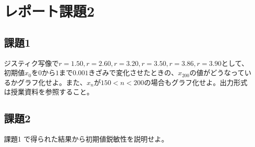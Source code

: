 \section{レポート課題2}
\subsection{課題1}
ジスティク写像で$r = 1.50, r = 2.60, r = 3.20, r = 3.50, r = 3.86, r = 3.90$として、初期値$x_0$を$0$から$1$まで$0.001$きざみで変化させたときの、$x_{200}$の値がどうなっているかグラフ化せよ。また、$x_n$が$150 < n < 200$の場合もグラフ化せよ。出力形式は授業資料を参照すること。
\subsection{課題2}
課題1 で得られた結果から初期値鋭敏性を説明せよ。